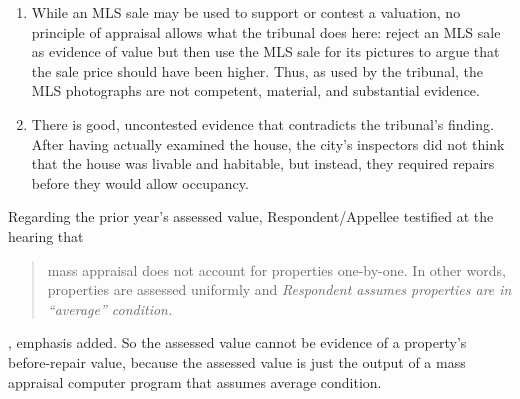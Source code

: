 \documentclass[12pt,\documentclassflag]{michiganCourtOfAppealsBrief}
\begin{document}
\begin{enumerate}
\item While an MLS sale may be used to support or contest a valuation, no principle of appraisal allows what the tribunal does here: reject an MLS sale as evidence of value but then use the MLS sale for its pictures to argue that the sale price should have been higher. Thus, as used by the tribunal, the MLS photographs are not competent, material, and substantial evidence.
\item There is good, uncontested evidence that contradicts the tribunal's finding. After having actually examined the house, the city's inspectors did not think that the house was livable and habitable, but instead, they required repairs before they would allow occupancy.
\end{enumerate}


Regarding the prior year's assessed value, Respondent/Appellee testified at the hearing that

\begin{quote}
  mass appraisal does not account for properties one-by-one. In other words, properties are assessed uniformly and \emph{Respondent assumes properties are in ``average'' condition.}
\end{quote}
\foj[4], emphasis added. So the assessed value cannot be evidence of a property's before-repair value, because the assessed value is just the output of a mass appraisal computer program that assumes average condition.
\end{document}
